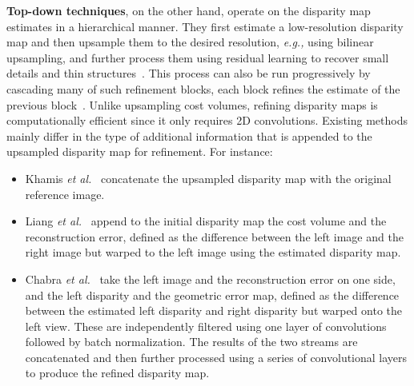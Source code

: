 \documentclass[10pt,journal,compsoc]{IEEEtran}
\newcommand{\eg}{\emph{e.g., }}
\newcommand{\etal}{\emph{et al.}}
\begin{document}
\textbf{Top-down techniques}, on the other hand, operate on the disparity map estimates in a hierarchical manner.  They  first estimate a low-resolution disparity map and then upsample them  to the desired resolution, \eg using bilinear upsampling,  and further process them  using residual learning to recover small details and thin structures~\cite{khamis2018stereonet,zhang2018activestereonet,chabra2019stereodrnet}. This process can also be run progressively by cascading many of such refinement blocks,  each block refines the estimate of the previous block~\cite{pang2017cascade,khamis2018stereonet}. Unlike upsampling cost volumes, refining disparity maps is computationally efficient since it only requires 2D convolutions. Existing methods mainly differ in the type of additional information that is appended to the upsampled disparity map for refinement. For instance:
\begin{itemize}
	\item Khamis \etal~\cite{khamis2018stereonet} concatenate the upsampled disparity map with the original reference image.
	\item Liang \etal~\cite{liang2018learning} append to the initial disparity  map the cost volume and the reconstruction error, defined as the difference between the left image and the right image but warped to the left image using the estimated disparity map. 
	\item Chabra \etal~\cite{chabra2019stereodrnet}  take the left image and the reconstruction error on one side, and the left disparity and the geometric error map, defined as the difference between the estimated left disparity and right disparity but warped onto the left view. These are independently filtered using one layer of convolutions followed by batch normalization. The results of the two streams are concatenated and then further processed using a series of convolutional layers to produce the refined disparity map.
\end{itemize}
\end{document}
